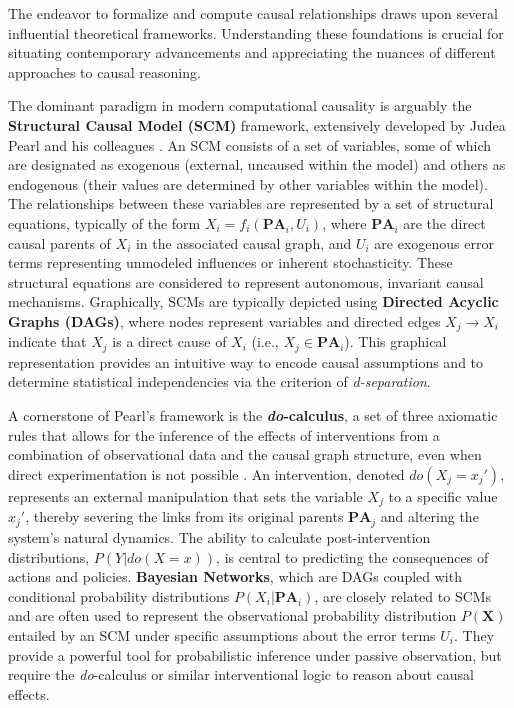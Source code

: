 The endeavor to formalize and compute causal relationships draws upon several influential theoretical frameworks. Understanding these foundations is crucial for situating contemporary advancements and appreciating the nuances of different approaches to causal reasoning.

The dominant paradigm in modern computational causality is arguably the \textbf{Structural Causal Model (SCM)} framework, extensively developed by Judea Pearl and his colleagues \cite{Pearl2009Causality}. An SCM consists of a set of variables, some of which are designated as exogenous (external, uncaused within the model) and others as endogenous (their values are determined by other variables within the model). The relationships between these variables are represented by a set of structural equations, typically of the form $X_i = f_i(\mathbf{PA}_i, U_i)$, where $\mathbf{PA}_i$ are the direct causal parents of $X_i$ in the associated causal graph, and $U_i$ are exogenous error terms representing unmodeled influences or inherent stochasticity. These structural equations are considered to represent autonomous, invariant causal mechanisms. Graphically, SCMs are typically depicted using \textbf{Directed Acyclic Graphs (DAGs)}, where nodes represent variables and directed edges $X_j \to X_i$ indicate that $X_j$ is a direct cause of $X_i$ (i.e., $X_j \in \mathbf{PA}_i$). This graphical representation provides an intuitive way to encode causal assumptions and to determine statistical independencies via the criterion of \textit{d-separation}.

A cornerstone of Pearl's framework is the \textbf{\textit{do}-calculus}, a set of three axiomatic rules that allows for the inference of the effects of interventions from a combination of observational data and the causal graph structure, even when direct experimentation is not possible \cite{Pearl2009Causality}. An intervention, denoted $do(X_j=x_j')$, represents an external manipulation that sets the variable $X_j$ to a specific value $x_j'$, thereby severing the links from its original parents $\mathbf{PA}_j$ and altering the system's natural dynamics. The ability to calculate post-intervention distributions, $P(Y | do(X=x))$, is central to predicting the consequences of actions and policies. \textbf{Bayesian Networks}, which are DAGs coupled with conditional probability distributions $P(X_i | \mathbf{PA}_i)$, are closely related to SCMs and are often used to represent the observational probability distribution $P(\mathbf{X})$ entailed by an SCM under specific assumptions about the error terms $U_i$. They provide a powerful tool for probabilistic inference under passive observation, but require the \textit{do}-calculus or similar interventional logic to reason about causal effects.


